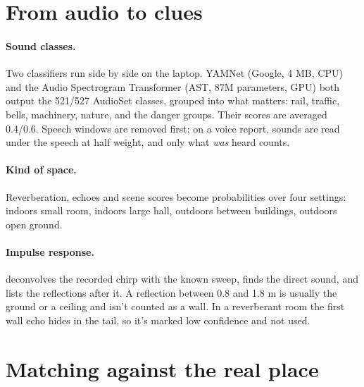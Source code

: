 \section{From audio to clues}

\paragraph{Sound classes.} Two classifiers run side by side on the laptop. YAMNet (Google, 4 MB, CPU) and the
Audio Spectrogram Transformer (AST, 87M parameters, GPU) both output the 521/527 AudioSet classes, grouped into
what matters: rail, traffic, bells, machinery, nature, and the danger groups. Their scores are averaged 0.4/0.6.
Speech windows are removed first; on a voice report, sounds are read under the speech at half weight, and only
what \emph{was} heard counts.

\paragraph{Kind of space.} Reverberation, echoes and scene scores become probabilities over four settings: indoors
small room, indoors large hall, outdoors between buildings, outdoors open ground.

\paragraph{Impulse response.}  deconvolves the recorded chirp with the known sweep, finds the direct
sound, and lists the reflections after it. A reflection between 0.8 and 1.8 m is usually the ground or a ceiling
and isn't counted as a wall. In a reverberant room the first wall echo hides in the tail, so it's marked low
confidence and not used.

\section{Matching against the real place}

